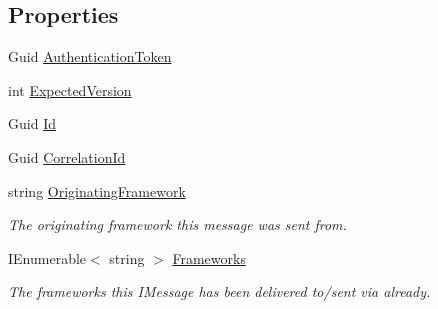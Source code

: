 \subsection*{Properties}
\begin{DoxyCompactItemize}
\item 
Guid \hyperlink{classCqrs_1_1Azure_1_1ServiceBus_1_1Tests_1_1Unit_1_1TestCommand_a98a038b33bcbfad2511543326906731c_a98a038b33bcbfad2511543326906731c}{Authentication\+Token}
\item 
int \hyperlink{classCqrs_1_1Azure_1_1ServiceBus_1_1Tests_1_1Unit_1_1TestCommand_a58e0bae017d2975548504adfb927d00d_a58e0bae017d2975548504adfb927d00d}{Expected\+Version}
\item 
Guid \hyperlink{classCqrs_1_1Azure_1_1ServiceBus_1_1Tests_1_1Unit_1_1TestCommand_a77486cace45920a8478bc6e8c8fd50c2_a77486cace45920a8478bc6e8c8fd50c2}{Id}
\item 
Guid \hyperlink{classCqrs_1_1Azure_1_1ServiceBus_1_1Tests_1_1Unit_1_1TestCommand_a1e92c111a69561faef294cd04839f236_a1e92c111a69561faef294cd04839f236}{Correlation\+Id}
\item 
string \hyperlink{classCqrs_1_1Azure_1_1ServiceBus_1_1Tests_1_1Unit_1_1TestCommand_a8bea2fea080417034c031252641d88cd_a8bea2fea080417034c031252641d88cd}{Originating\+Framework}
\begin{DoxyCompactList}\small\item\em The originating framework this message was sent from. \end{DoxyCompactList}\item 
I\+Enumerable$<$ string $>$ \hyperlink{classCqrs_1_1Azure_1_1ServiceBus_1_1Tests_1_1Unit_1_1TestCommand_acc509116aa049e8812c964233775d0c6_acc509116aa049e8812c964233775d0c6}{Frameworks}
\begin{DoxyCompactList}\small\item\em The frameworks this I\+Message has been delivered to/sent via already. \end{DoxyCompactList}\end{DoxyCompactItemize}


